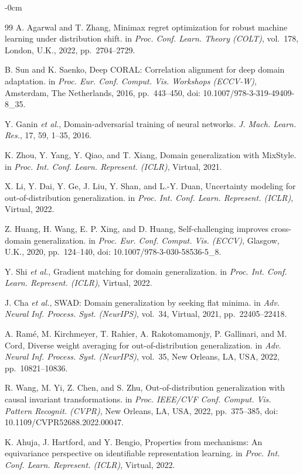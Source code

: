 \documentclass[electronics,article,submit,moreauthors]{Definitions/mdpi}
\begin{document}
\begin{adjustwidth}{-\extralength}{0cm}
\begin{thebibliography}{99}
A. Agarwal and T. Zhang, Minimax regret optimization for robust machine learning under distribution shift. in \emph{Proc. Conf. Learn. Theory (COLT)}, vol.~178, London, U.K., 2022, pp.~2704--2729.


B. Sun and K. Saenko, Deep CORAL: Correlation alignment for deep domain adaptation. in \emph{Proc. Eur. Conf. Comput. Vis. Workshops (ECCV-W)}, Amsterdam, The Netherlands, 2016, pp.~443--450, doi: 10.1007/978-3-319-49409-8\_35.


Y. Ganin \emph{et al.}, Domain-adversarial training of neural networks. \emph{J. Mach. Learn. Res.}, 17, 59, 1--35, 2016.


K. Zhou, Y. Yang, Y. Qiao, and T. Xiang, Domain generalization with MixStyle. in \emph{Proc. Int. Conf. Learn. Represent. (ICLR)}, Virtual, 2021.


X. Li, Y. Dai, Y. Ge, J. Liu, Y. Shan, and L.-Y. Duan, Uncertainty modeling for out-of-distribution generalization. in \emph{Proc. Int. Conf. Learn. Represent. (ICLR)}, Virtual, 2022.


Z. Huang, H. Wang, E. P. Xing, and D. Huang, Self-challenging improves cross-domain generalization. in \emph{Proc. Eur. Conf. Comput. Vis. (ECCV)}, Glasgow, U.K., 2020, pp.~124--140, doi: 10.1007/978-3-030-58536-5\_8.


Y. Shi \emph{et al.}, Gradient matching for domain generalization. in \emph{Proc. Int. Conf. Learn. Represent. (ICLR)}, Virtual, 2022.


J. Cha \emph{et al.}, SWAD: Domain generalization by seeking flat minima. in \emph{Adv. Neural Inf. Process. Syst. (NeurIPS)}, vol.~34, Virtual, 2021, pp.~22405--22418.


A. Ram\'e, M. Kirchmeyer, T. Rahier, A. Rakotomamonjy, P. Gallinari, and M. Cord, Diverse weight averaging for out-of-distribution generalization. in \emph{Adv. Neural Inf. Process. Syst. (NeurIPS)}, vol.~35, New Orleans, LA, USA, 2022, pp.~10821--10836.


R. Wang, M. Yi, Z. Chen, and S. Zhu, Out-of-distribution generalization with causal invariant transformations. in \emph{Proc. IEEE/CVF Conf. Comput. Vis. Pattern Recognit. (CVPR)}, New Orleans, LA, USA, 2022, pp.~375--385, doi: 10.1109/CVPR52688.2022.00047.


K. Ahuja, J. Hartford, and Y. Bengio, Properties from mechanisms: An equivariance perspective on identifiable representation learning. in \emph{Proc. Int. Conf. Learn. Represent. (ICLR)}, Virtual, 2022.



\end{thebibliography}
\end{adjustwidth}
\end{document}
